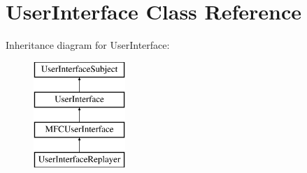 \hypertarget{classUserInterface}{
\section{UserInterface Class Reference}
\label{classUserInterface}
}
Inheritance diagram for UserInterface:\begin{figure}[H]
\begin{center}
\leavevmode
\includegraphics[height=4cm]{classUserInterface}
\end{center}
\end{figure}
